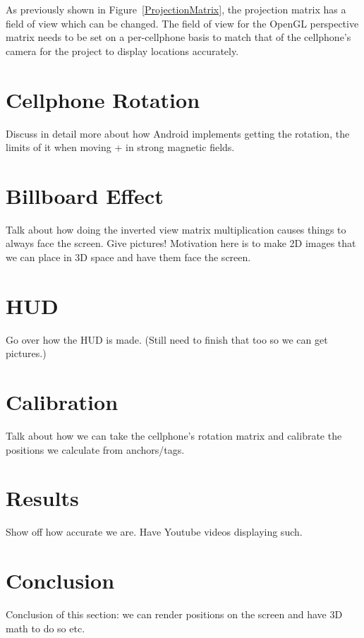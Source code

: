 As previously shown in Figure~\ref{ProjectionMatrix}, the projection matrix has a field of view which can be changed. The field of view for the OpenGL perspective matrix needs to be set on a per-cellphone basis to match that of the cellphone's camera for the project to display locations accurately.

\section{Cellphone Rotation}
Discuss in detail more about how Android implements getting the rotation, the limits of it when moving + in strong magnetic fields.

\section{Billboard Effect}
Talk about how doing the inverted view matrix multiplication causes things to always face the screen. Give pictures! Motivation here is to make 2D images that we can place in 3D space and have them face the screen.

\section{HUD}
Go over how the HUD is made. (Still need to finish that too so we can get pictures.)

\section{Calibration}
Talk about how we can take the cellphone's rotation matrix and calibrate the positions we calculate from anchors/tags.

\section{Results}
Show off how accurate we are. Have Youtube videos displaying such.

\section{Conclusion}
Conclusion of this section: we can render positions on the screen and have 3D math to do so etc.
